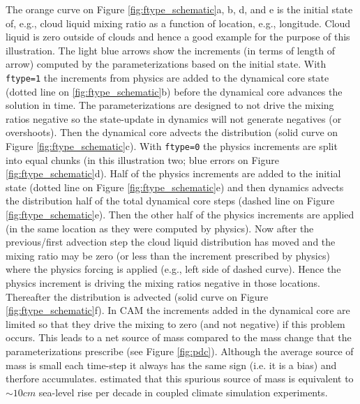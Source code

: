 \documentclass{agujournal}
\begin{document}
The orange curve on Figure \ref{fig:ftype_schematic}a, b, d, and e is the initial state of, e.g., cloud liquid mixing ratio as a function of location, e.g., longitude. Cloud liquid is zero outside of clouds and hence a good example for the purpose of this illustration. The light blue arrows show the increments (in terms of length of arrow) computed by the parameterizations based on the initial state. With {\tt{ftype=1}} the increments from physics are added to the dynamical core state (dotted line on \ref{fig:ftype_schematic}b) before the dynamical core advances the solution in time. The parameterizations are designed to not drive the mixing ratios negative so the state-update in dynamics will not generate negatives (or overshoots). Then the dynamical core advects the distribution (solid curve on Figure \ref{fig:ftype_schematic}c). With {\tt{ftype=0}} the physics increments are split into equal chunks (in this illustration two; blue errors on Figure \ref{fig:ftype_schematic}d). Half of the physics increments are added to the initial state (dotted line on Figure \ref{fig:ftype_schematic}e) and then dynamics advects the distribution half of the total dynamical core steps (dashed line on Figure \ref{fig:ftype_schematic}e). Then the other half of the physics increments are applied (in the same location as they were computed by physics). Now after the previous/first advection step the cloud liquid distribution has moved and the mixing ratio may be zero (or less than the increment prescribed by physics) where the physics forcing is applied (e.g., left side of dashed curve). Hence the physics increment is driving the mixing ratios negative in those locations. Thereafter the distribution is advected (solid curve on Figure \ref{fig:ftype_schematic}f). In CAM the increments added in the dynamical core are limited so that they drive the mixing to zero (and not negative) if this problem occurs. This leads to a net source of mass compared to the mass change that the parameterizations prescribe (see Figure \ref{fig:pdc}). Although the average source of mass is small each time-step it always has the same sign (i.e. it is a bias) and therfore accumulates. \citet{water-leak} estimated that this spurious source of mass is equivalent to $\sim 10cm$ sea-level rise per decade in coupled climate simulation experiments.
\end{document}
